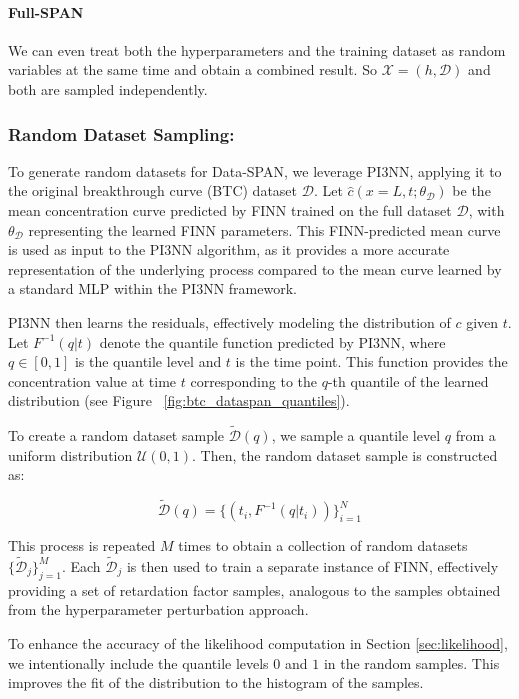 \paragraph{Full-SPAN}

We can even treat both the hyperparameters and the training dataset as random variables at the same time and obtain a combined result. So $\mathcal{X} = (h, \mathcal{D})$ and both are sampled independently.


\subsubsection{Random Dataset Sampling:}
\label{sec:random_dataset_sampling}
To generate random datasets for Data-SPAN, we leverage PI3NN, applying it to the original breakthrough curve (BTC) dataset $\mathcal{D}$. Let $\hat{c}(x=L, t; \theta_{\mathcal{D}})$ be the mean concentration curve predicted by FINN trained on the full dataset $\mathcal{D}$, with $\theta_{\mathcal{D}}$ representing the learned FINN parameters. This FINN-predicted mean curve is used as input to the PI3NN algorithm, as it provides a more accurate representation of the underlying process compared to the mean curve learned by a standard MLP within the PI3NN framework.

PI3NN then learns the residuals, effectively modeling the distribution of $c$ given $t$. Let $F^{-1}(q | t)$ denote the quantile function predicted by PI3NN, where $q \in [0, 1]$ is the quantile level and $t$ is the time point. This function provides the concentration value at time $t$ corresponding to the $q$-th quantile of the learned distribution (see Figure ~\vref{fig:btc_dataspan_quantiles}).

To create a random dataset sample $\tilde{\mathcal{D}}(q)$, we sample a quantile level $q$ from a uniform distribution $\mathcal{U}(0, 1)$. Then, the random dataset sample is constructed as:

$$
\tilde{\mathcal{D}}(q) = \{ (t_i, F^{-1}(q | t_i) ) \}_{i=1}^N
$$

This process is repeated $M$ times to obtain a collection of random datasets $\{\tilde{\mathcal{D}}_j\}_{j=1}^M$. Each $\tilde{\mathcal{D}}_j$ is then used to train a separate instance of FINN, effectively providing a set of retardation factor samples, analogous to the samples obtained from the hyperparameter perturbation approach.

To enhance the accuracy of the likelihood computation in Section \vref{sec:likelihood}, we intentionally include the quantile levels $0$ and $1$ in the random samples. This improves the fit of the distribution to the histogram of the samples.


